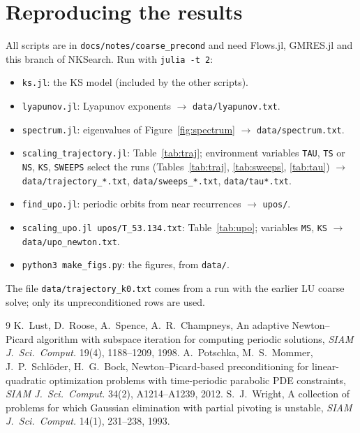 \documentclass[11pt,a4paper]{article}
\begin{document}
\section{Reproducing the results}

All scripts are in \texttt{docs/notes/coarse\_precond} and need Flows.jl, GMRES.jl and this branch of NKSearch. Run with \texttt{julia -t 2}:
\begin{itemize}
\item \texttt{ks.jl}: the KS model (included by the other scripts).
\item \texttt{lyapunov.jl}: Lyapunov exponents $\to$ \texttt{data/lyapunov.txt}.
\item \texttt{spectrum.jl}: eigenvalues of Figure~\ref{fig:spectrum} $\to$ \texttt{data/spectrum.txt}.
\item \texttt{scaling\_trajectory.jl}: Table~\ref{tab:traj}; environment variables \texttt{TAU}, \texttt{TS} or \texttt{NS}, \texttt{KS}, \texttt{SWEEPS} select the runs (Tables~\ref{tab:traj}, \ref{tab:sweeps}, \ref{tab:tau}) $\to$ \texttt{data/trajectory\_*.txt}, \texttt{data/sweeps\_*.txt}, \texttt{data/tau*.txt}.
\item \texttt{find\_upo.jl}: periodic orbits from near recurrences $\to$ \texttt{upos/}.
\item \texttt{scaling\_upo.jl upos/T\_53.134.txt}: Table~\ref{tab:upo}; variables \texttt{MS}, \texttt{KS} $\to$ \texttt{data/upo\_newton.txt}.
\item \texttt{python3 make\_figs.py}: the figures, from \texttt{data/}.
\end{itemize}
The file \texttt{data/trajectory\_k0.txt} comes from a run with the earlier LU coarse solve; only its unpreconditioned rows are used.

\begin{thebibliography}{9}
 K.~Lust, D.~Roose, A.~Spence, A.~R.~Champneys, An adaptive Newton--Picard algorithm with subspace iteration for computing periodic solutions, \emph{SIAM J.\ Sci.\ Comput.} 19(4), 1188--1209, 1998.
 A.~Potschka, M.~S.~Mommer, J.~P.~Schl\"oder, H.~G.~Bock, Newton--Picard-based preconditioning for linear-quadratic optimization problems with time-periodic parabolic PDE constraints, \emph{SIAM J.\ Sci.\ Comput.} 34(2), A1214--A1239, 2012.
 S.~J.~Wright, A collection of problems for which Gaussian elimination with partial pivoting is unstable, \emph{SIAM J.\ Sci.\ Comput.} 14(1), 231--238, 1993.
\end{thebibliography}
\end{document}
